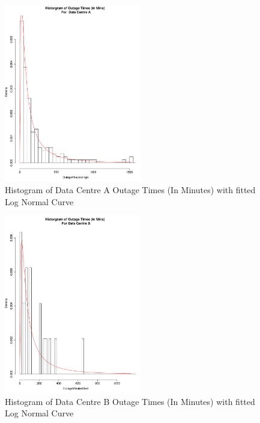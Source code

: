 \documentclass[conference]{IEEEtran}
\begin{document}
\begin{figure}
\begin{center}
\includegraphics[width=6cm]{graph11.pdf} 
\caption{ Histogram of Data Centre A Outage Times (In Minutes) with fitted Log Normal Curve}
\end{center}
\label{fig:outagedistribution}
\end{figure}

\begin{figure}
\begin{center}
\includegraphics[width=6cm]{graph12.pdf} 
\caption{ Histogram of  Data Centre B Outage Times (In Minutes) with fitted Log Normal Curve}
\end{center}
\label{fig:outagedistribution}
\end{figure}
\end{document}
